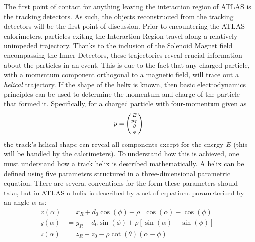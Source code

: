             The first point of contact for anything leaving the interaction region of ATLAS is the tracking detectors.
            As such, the objects reconstructed from the tracking detectors will be the first point of discussion.
            Prior to encountering the ATLAS calorimeters,
                particles exiting the Interaction Region travel along a relatively unimpeded trajectory.
            Thanks to the inclusion of the Solenoid Magnet field encompassing the Inner Detectors,
                these trajectories reveal crucial information about the particles in an event.
            This is due to the fact that any charged particle, with a momentum component orthogonal to a magnetic field,
                will trace out a \textit{helical} trajectory.
            If the shape of the helix is known, then basic electrodynamics principles can be used to determine the
                momentum and charge of the particle that formed it.
            Specifically, for a charged particle with four-momentum given as 
            \begin{equation}
            p = \minimatrix{E \\ p_T \\ \theta \\ \phi}
            \end{equation}
            the track's helical shape can reveal all components except for the energy $E$ (this will be handled by the calorimeters).
            To understand how this is achieved, one must understand how a track helix is described mathematically.
            A helix can be defined using five parameters structured in a three-dimensional parametric equation.
            There are several conventions for the form these parameters should take,
                but in ATLAS a helix is described\cite{thesis_giacinto} by a set of equations parameterised by an angle $\alpha$ as:
            \begin{equation} \begin{split}
            x(\alpha) &= x_R + d_0 \cos(\phi) + \rho \left[ \cos(\alpha) - \cos(\phi) \right] \\
            y(\alpha) &= y_R + d_0 \sin(\phi) + \rho \left[ \sin(\alpha) - \sin(\phi) \right] \\
            z(\alpha) &= z_R + z_0 - \rho \cot(\theta) (\alpha - \phi)
            \end{split} \end{equation}

